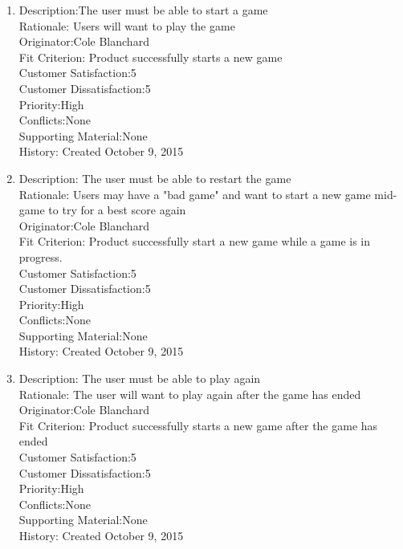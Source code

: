 \documentclass[12pt]{article}
\begin{document}
\begin{enumerate}
 
 \item Description:The user must be able to start a game\\
 Rationale: Users will want to play the game\\
 Originator:Cole Blanchard\\
 Fit Criterion: Product successfully starts a new game\\
 Customer Satisfaction:5\\
 Customer Dissatisfaction:5\\
 Priority:High\\
 Conflicts:None\\
 Supporting Material:None\\
 History: Created October 9, 2015\\
 
 \item Description: The user must be able to restart the game\\
 Rationale: Users may have a "bad game" and want to start a new game mid-game to try for a best score again \\
 Originator:Cole Blanchard\\
 Fit Criterion: Product successfully start a new game while a game is in progress.\\
 Customer Satisfaction:5\\
 Customer Dissatisfaction:5\\
 Priority:High\\
 Conflicts:None\\
 Supporting Material:None\\
 History: Created October 9, 2015\\
 
 \item Description: The user must be able to play again\\
 Rationale: The user will want to play again after the game has ended\\
 Originator:Cole Blanchard\\
 Fit Criterion: Product successfully starts a new game after the game has ended\\
 Customer Satisfaction:5\\
 Customer Dissatisfaction:5\\
 Priority:High\\
 Conflicts:None\\
 Supporting Material:None\\
 History: Created October 9, 2015\\
 

\end{enumerate}
\end{document}
